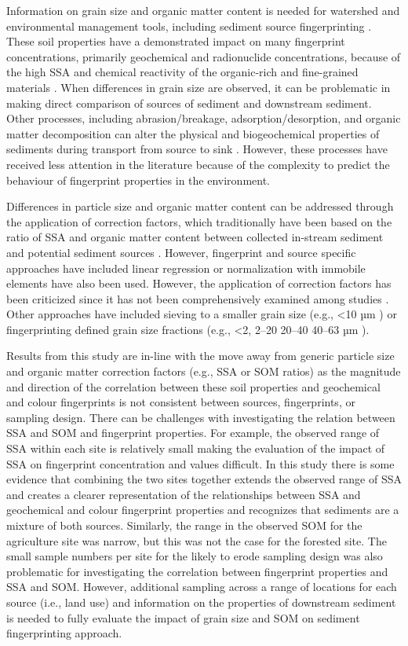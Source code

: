 \documentclass[
  number]{elsarticle}
\begin{document}
Information on grain size and organic matter content is needed for
watershed and environmental management tools, including sediment source
fingerprinting \citep{laceby2017}. These soil properties have a
demonstrated impact on many fingerprint concentrations, primarily
geochemical and radionuclide concentrations, because of the high SSA and
chemical reactivity of the organic-rich and fine-grained materials
\citep{horowitz1991}. When differences in grain size are observed, it
can be problematic in making direct comparison of sources of sediment
and downstream sediment. Other processes, including abrasion/breakage,
adsorption/desorption, and organic matter decomposition can alter the
physical and biogeochemical properties of sediments during transport
from source to sink \citep{koiter2013}. However, these processes have
received less attention in the literature because of the complexity to
predict the behaviour of fingerprint properties in the environment.

Differences in particle size and organic matter content can be addressed
through the application of correction factors, which traditionally have
been based on the ratio of SSA and organic matter content between
collected in-stream sediment and potential sediment sources
\citep{collins1997}. However, fingerprint and source specific approaches
have included linear regression \citep{gellis2013} or normalization with
immobile elements \citep{vale2016} have also been used. However, the
application of correction factors has been criticized since it has not
been comprehensively examined among studies \citep{laceby2017}. Other
approaches have included sieving to a smaller grain size (e.g.,
\textless10 µm \citep{wilkinson2009}) or fingerprinting defined grain
size fractions (e.g., \textless2, 2--20 20--40 40--63 µm
\citep{hatfield2009}).

Results from this study are in-line with the move away from generic
particle size and organic matter correction factors (e.g., SSA or SOM
ratios) as the magnitude and direction of the correlation between these
soil properties and geochemical and colour fingerprints is not
consistent between sources, fingerprints, or sampling design. There can
be challenges with investigating the relation between SSA and SOM and
fingerprint properties. For example, the observed range of SSA within
each site is relatively small making the evaluation of the impact of SSA
on fingerprint concentration and values difficult. In this study there
is some evidence that combining the two sites together extends the
observed range of SSA and creates a clearer representation of the
relationships between SSA and geochemical and colour fingerprint
properties and recognizes that sediments are a mixture of both sources.
Similarly, the range in the observed SOM for the agriculture site was
narrow, but this was not the case for the forested site. The small
sample numbers per site for the likely to erode sampling design was also
problematic for investigating the correlation between fingerprint
properties and SSA and SOM. However, additional sampling across a range
of locations for each source (i.e., land use) and information on the
properties of downstream sediment is needed to fully evaluate the impact
of grain size and SOM on sediment fingerprinting approach.
\end{document}
